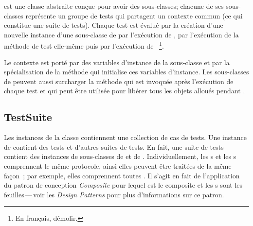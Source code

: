 \documentclass[a4paper,10pt,twoside]{book}
\begin{document}
 est une classe abstraite conçue pour avoir des sous-classes; chacune de ses sous-classes représente un groupe de tests qui partagent un contexte commun (ce qui constitue une suite de tests). 
Chaque test est évalué par la création d'une nouvelle instance d'une sous-classe de  par l'exécution de , par l'exécution de la méthode de test elle-même puis par l'exécution de ~\footnote{En français, démolir.}.

Le contexte est porté par des variables d'instance de la sous-classe et par la spécialisation de la méthode  qui initialise ces variables d'instance.  Les sous-classes de  peuvent aussi surcharger la méthode  qui est invoquée après l'exécution de chaque test et qui peut être utilisée pour libérer tous les objets alloués pendant .
\subsection{TestSuite}

Les instances de la classe  contiennent une collection de cas de tests. Une instance de  contient des tests et d'autres suites de tests. En fait, une suite de tests contient des instances de sous-classes de  et de .
Individuellement, les s et les s comprennent le même protocole, ainsi elles peuvent être traitées de la même façon~; par exemple, elles comprennent toutes .
Il s'agit en fait de l'application du patron de conception 
\emph{Composite}
pour lequel  est le composite et les s sont les feuilles\,---\,voir les \textit{Design Patterns} pour plus d'informations sur ce patron\cite{Gamm95a}.
\end{document}
